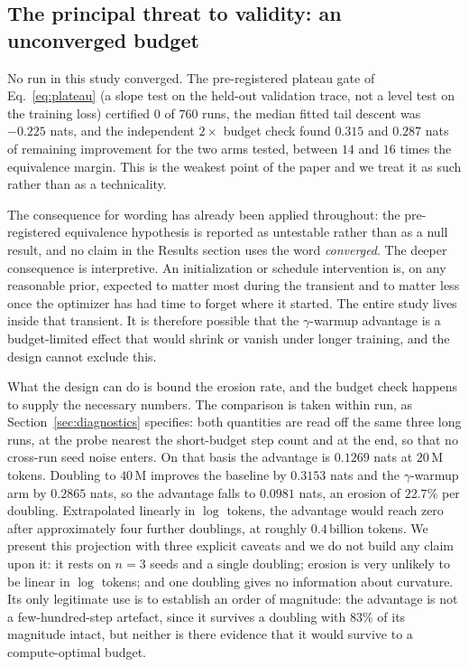 \documentclass[final,5p,times,twocolumn]{elsarticle}
\theoremstyle{remark}
\begin{document}
\subsection{The principal threat to validity: an unconverged budget}
\label{sec:disc-budget}

No run in this study converged. The pre-registered plateau gate of
Eq.~\eqref{eq:plateau} (a slope test on the held-out validation trace, not a
level test on the training loss) certified $0$ of $760$ runs, the median
fitted tail descent was $-0.225$ nats, and the independent $2\times$ budget
check found $0.315$ and $0.287$ nats of remaining improvement for the two arms
tested, between $14$ and $16$ times the equivalence margin. This is the
weakest point of the paper and we treat it as such rather than as a
technicality.

The consequence for wording has already been applied throughout: the
pre-registered equivalence hypothesis is reported as untestable rather than as
a null result, and no claim in the Results section uses the word \emph{converged}.
The deeper consequence is interpretive. An initialization or schedule
intervention is, on any reasonable prior, expected to matter most during the
transient and to matter less once the optimizer has had time to forget where it
started. The entire study lives inside that transient. It is therefore possible
that the $\gamma$-warmup advantage is a budget-limited effect that would shrink
or vanish under longer training, and the design cannot exclude this.

What the design can do is bound the erosion rate, and the budget check
happens to supply the necessary numbers. The comparison is taken within run,
as Section~\ref{sec:diagnostics} specifies: both quantities are read off the
same three long runs, at the probe nearest the short-budget step count and at
the end, so that no cross-run seed noise enters. On that basis the advantage
is $0.1269$ nats at $20$\,M tokens. Doubling to $40$\,M improves the baseline
by $0.3153$ nats and the $\gamma$-warmup arm by $0.2865$ nats, so the
advantage falls to $0.0981$ nats, an erosion of $22.7\%$ per doubling.
Extrapolated linearly in $\log$ tokens, the advantage would reach zero after
approximately four further doublings, at roughly $0.4$\,billion tokens. We present this projection
with three explicit caveats and we do not build any claim upon it: it rests on
$n = 3$ seeds and a single doubling; erosion is very unlikely to be linear in
$\log$ tokens; and one doubling gives no information about curvature. Its only
legitimate use is to establish an order of magnitude: the advantage is not a
few-hundred-step artefact, since it survives a doubling with $83\%$ of its
magnitude intact, but neither is there evidence that it would survive to a
compute-optimal budget.
\end{document}
